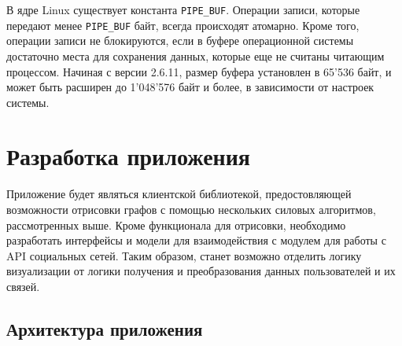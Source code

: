 \documentclass[14pt, russian]{scrartcl}
\begin{document}
В ядре Linux существует константа \verb|PIPE_BUF|. Операции записи, которые
передают менее \verb|PIPE_BUF| байт, всегда происходят атомарно. Кроме того,
операции записи не блокируются, если в буфере операционной системы достаточно
места для сохранения данных, которые еще не считаны читающим процессом. Начиная
с версии 2.6.11, размер буфера установлен в 65'536 байт, и может быть расширен
до 1'048'576 байт и более, в зависимости от настроек системы.

\section{Разработка приложения}

Приложение будет являться клиентской библиотекой, предостовляющей возможности
отрисовки графов с помощью нескольких силовых алгоритмов, рассмотренных выше.
Кроме функционала для отрисовки, необходимо разработать интерфейсы и модели для
взаимодействия с модулем для работы с API социальных сетей. Таким образом,
станет возможно отделить логику визуализации от логики получения и
преобразования данных пользователей и их связей.

\subsection{Архитектура приложения}
\end{document}

